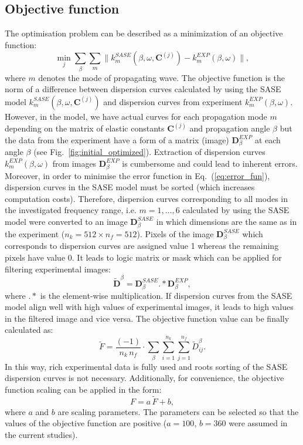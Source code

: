 \documentclass[preprint,12pt]{elsarticle}
\newcommand{\matr}[1]{\mathbf{#1}} %
\begin{document}
	\subsection{Objective function}
	The optimisation problem can be described as a minimization of an objective function:
	\begin{equation}
	\min_j \sum_{\beta}\sum_{m} \| k^{SASE}_{m}(\beta, \omega,\matr{C}^{(j)}) -k^{EXP}_{m}(\beta,\omega) \|,
	\label{eq:error_fun}
	\end{equation}
where \(m\) denotes the mode of propagating wave.
The objective function is the norm of a difference between dispersion curves calculated by using the SASE model \(k^{SASE}_{m}(\beta, \omega,\matr{C}^{(j)})\) and dispersion curves from experiment \(k^{EXP}_{m}(\beta,\omega)\). 
However, in the model, we have actual curves for each propagation mode \(m\) depending on the matrix of elastic constants \(\matr{C}^{(j)}\) and propagation angle \(\beta\) but the data from the experiment have a form of a matrix (image) \(\matr{D}^{EXP}_{\beta}\) at each angle \(\beta\) (see Fig.~\ref{fig:initial_optimized}).
Extraction of dispersion curves \(k^{EXP}_{m}(\beta,\omega)\) from images \(\matr{D}^{EXP}_{\beta}\) is cumbersome and could lead to inherent errors. 
Moreover, in order to minimise the error function in Eq.~(\ref{eq:error_fun}), dispersion curves in the SASE model must be sorted (which increases computation costs). 
Therefore, dispersion curves corresponding to all modes in the investigated frequency range, i.e. \(m=1,\ldots, 6\) calculated by using the SASE model were converted to an image \(\matr{D}^{SASE}_{\beta}\) in which dimensions are the same as in the experiment (\(n_k=512 \times n_f= 512\)). 
Pixels of the image \(\matr{D}^{SASE}_{\beta}\) which corresponds to dispersion curves are assigned value 1 whereas the remaining pixels have value 0. 
It leads to logic matrix or mask which can be applied for filtering experimental images: 
	\begin{equation}
		\tilde{\matr{D}}^{\beta} =  \matr{D}^{SASE}_{\beta}  .*    \matr{D}^{EXP}_{\beta} ,
		\label{eq:objective_fun}
   \end{equation}	
where \(.*\) is the element-wise multiplication. 
If dispersion curves from the SASE model align well with high values of experimental images, it leads to high values in the filtered image and vice versa.
The objective function value can be finally calculated as: 
	\begin{equation}
	\tilde{F} = \frac{(-1)}{n_k \, n_f}  \cdot \sum_{\beta}  \sum_{i=1}^{n_k} \sum_{j=1}^{n_f}	\tilde{D}_{ij}^{\beta}. 
	\label{eq:objective_fun_val}
	\end{equation}
In this way, rich experimental data is fully used and roots sorting of the SASE dispersion curves is not necessary. 
Additionally, for convenience, the objective function scaling can be applied in the form:
	\begin{equation}
	F = a \,  \tilde{F} + b,
	\end{equation}
where \(a\) and \(b\) are scaling parameters. The parameters can be selected so that the values of the objective function are positive (\(a=100\), \(b=360\) were assumed in the current studies).
	
\end{document}
